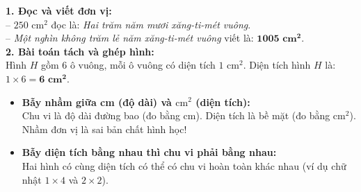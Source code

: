 \documentclass[11pt,a4paper]{article}
\begin{document}
\vspace{-2.5mm}
\noindent
\begin{minipage}[t]{0.49\textwidth}\vspace{0pt}
\begin{tcolorbox}[
  enhanced,
  colback=green!4!white,
  colframe=green!60!black,
  arc=2mm, boxrule=0.8pt,
  left=2mm, right=2mm, top=1.8mm, bottom=1.8mm,
  title={\footnotesize\bfseries\color{white}\faCheckCircle\ Ví dụ thực hành chuẩn mực}
]
{\footnotesize
\textbf{1. Đọc và viết đơn vị:}\\
-- $250\text{ cm}^2$ đọc là: \textit{Hai trăm năm mươi xăng-ti-mét vuông}.\\
-- \textit{Một nghìn không trăm lẻ năm xăng-ti-mét vuông} viết là: $\mathbf{1005\text{ cm}^2}$.\\
\textbf{2. Bài toán tách và ghép hình:}\\
Hình $H$ gồm $6$ ô vuông, mỗi ô vuông có diện tích $1\text{ cm}^2$. Diện tích hình $H$ là:\\
$1 \times 6 = \mathbf{6\text{ cm}^2}$.
}
\end{tcolorbox}
\end{minipage}
\hfill
\begin{minipage}[t]{0.49\textwidth}\vspace{0pt}
\begin{tcolorbox}[
  enhanced,
  colback=red!4!white,
  colframe=red!70!black,
  arc=2mm, boxrule=0.8pt,
  left=2mm, right=2mm, top=1.8mm, bottom=1.8mm,
  title={\footnotesize\bfseries\color{white}\faExclamationTriangle\ Mẹo tránh bẫy trắc nghiệm}
]
{\footnotesize
\begin{itemize}\setlength{\itemsep}{1.5pt}\setlength{\leftskip}{-2.5mm}
  \item \textbf{Bẫy nhầm giữa cm (độ dài) và $\text{cm}^2$ (diện tích):}\\
  Chu vi là độ dài đường bao (đo bằng $\text{cm}$). Diện tích là bề mặt (đo bằng $\text{cm}^2$). Nhầm đơn vị là sai bản chất hình học!
  \item \textbf{Bẫy diện tích bằng nhau thì chu vi phải bằng nhau:}\\
  Hai hình có cùng diện tích có thể có chu vi hoàn toàn khác nhau (ví dụ chữ nhật $1 \times 4$ và $2 \times 2$).
\end{itemize}
}
\end{tcolorbox}
\end{minipage}
\end{document}

